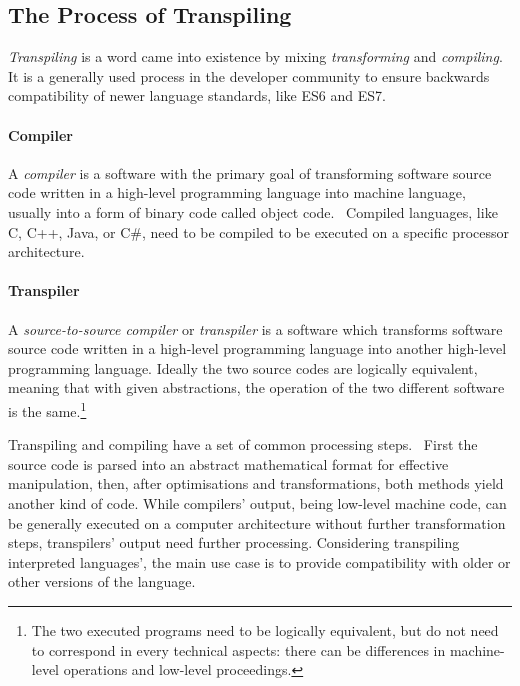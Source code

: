 \subsection{The Process of Transpiling}

\emph{Transpiling} is a word came into existence by mixing \emph{transforming} and \emph{compiling}. It is a generally used process in the \es developer community to ensure backwards compatibility of newer \es language standards, like ES6 and ES7.

\paragraph{Compiler}

A \emph{compiler} is a software with the primary goal of transforming software source code written in a high-level programming language into machine language, usually into a form of binary code called object code.~\cite{pcmagcompilers} Compiled languages, like C, C++, Java, or C\#, need to be compiled to be executed on a specific processor architecture.

\paragraph{Transpiler}

A \emph{source-to-source compiler} or \emph{transpiler} is a software which transforms software source code written in a high-level programming language into another high-level programming language. Ideally the two source codes are logically equivalent, meaning that with given abstractions, the operation of the two different software is the same.\footnote{The two executed programs need to be logically equivalent, but do not need to correspond in every technical aspects: there can be differences in machine-level operations and low-level proceedings.}

Transpiling and compiling have a set of common processing steps.~\cite{kulkarnitranspiler} First the source code is parsed into an abstract mathematical format for effective manipulation, then, after optimisations and transformations, both methods yield another kind of code. While compilers' output, being low-level machine code, can be generally executed on a computer architecture without further transformation steps, transpilers' output need further processing. Considering transpiling interpreted languages', the main use case is to provide compatibility with older or other versions of the language.


